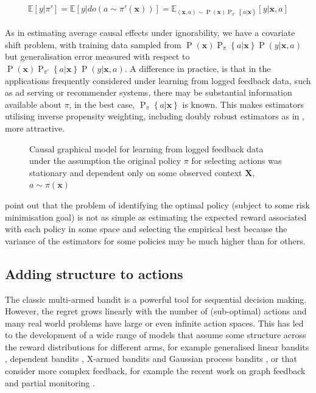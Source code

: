 \documentclass[11pt,a4paper,oneside]{book}
\newcommand{\Pns}[2]{\operatorname{P}_{#1}\left\{#2\right\}}
\newcommand{\Esub}[2]{\mathbb E_{#1}\left[{#2}\right]}
\newcommand{\E}[1]{\mathbb E\left[{#1}\right]}
\newcommand{\eqn}[1]{\begin{align}#1\end{align}}
\renewcommand{\P}[1]{\operatorname{P}\left(#1\right)}
\renewcommand{\vec}[1]{\boldsymbol{#1}}
\theoremstyle{plain}
\theoremstyle{definition}
\begin{document}
\eqn{
\E{y|\pi'} = \E{y|do(a \sim \pi'(\vec{x}))} = \Esub{(\vec{x},a) \sim \P{\vec{x}}\Pns{\pi'}{a|\vec{x}}}{y|\vec{x},a}
}

As in estimating average causal effects under ignorability, we have a covariate shift problem, with training data sampled from $\P{\vec{x}}\Pns{\pi}{a|\vec{x}}\P{y|\vec{x},a}$ but generalisation error measured with respect to $\P{\vec{x}}\Pns{\pi'}{a|\vec{x}}\P{y|\vec{x},a}$. A difference in practice, is that in the applications frequently considered under learning from logged feedback data, such as ad serving or recommender systems, there may be substantial information available about $\pi$, in the best case, $\Pns{\pi}{a|\vec{x}}$ is known. This makes estimators utilising inverse propensity weighting, including doubly robust estimators as in \citet{Dudik2011}, more attractive. 

\begin{figure}
\centering
{} 
\caption{Causal graphical model for learning from logged feedback data under the assumption the original policy $\pi$ for selecting actions was stationary and dependent only on some observed context $\vec{X}$, $a \sim \pi(\vec{x})$}
\label{fig:off-policy-evaluation}
\end{figure}



\citet{Swaminathan2015} point out that the problem of identifying the optimal policy (subject to some risk minimisation goal) is not as simple as estimating the expected reward associated with each policy in some space and selecting the empirical best because the variance of the estimators for some policies may be much higher than for others.

\subsection{Adding structure to actions}

The classic multi-armed bandit is a powerful tool for sequential decision making. However, the regret grows linearly with the number of (sub-optimal) actions and many real world problems have large or even infinite action spaces. This has led to the development of a wide range of models that assume some structure across the reward distributions for different arms, for example generalised linear bandits \citep{filippi2010parametric}, dependent bandits \citep{Pandey2007}, X-armed bandits \citep{Bubeck2010} and Gaussian process bandits \citep{srinivas2009gaussian}, or that consider more complex feedback, for example the recent work on graph feedback\citep{Mannor2011,Lelarge2012,Alon2013,Buccapatnam2014,Kocak2014,Alon2015} and partial monitoring \citep{Piccolboni2001,Bartok2014}.
\end{document}
